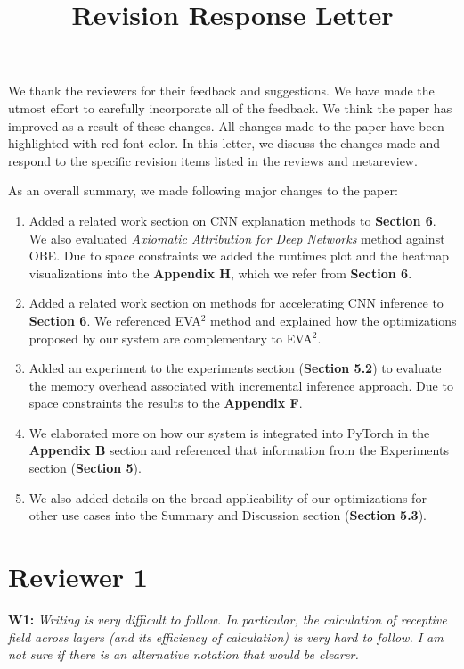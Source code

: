 \documentclass[preprint]{vldb}
\title{Revision Response Letter}
\author{}
\begin{document}
\maketitle

We thank the reviewers for their feedback and suggestions.
We have made the utmost effort to carefully incorporate all of the feedback. 
We think the paper has improved as a result of these changes.
All changes made to the paper have been highlighted with red font color.
In this letter, we discuss the changes made and respond to the specific revision items listed in the reviews and metareview.

As an overall summary, we made following major changes to the paper:
\begin{enumerate}
	\item Added a related work section on CNN explanation methods to \textbf{Section 6}.
	We also evaluated \textit{Axiomatic Attribution for Deep Networks} method against OBE.
	Due to space constraints we added the runtimes plot and the heatmap visualizations into the \textbf{Appendix H}, which we refer from \textbf{Section 6}.
	\item Added a related work section on methods for accelerating CNN inference to \textbf{Section 6}.
	We referenced EVA$^2$ method and explained how the optimizations proposed by our system are complementary to EVA$^2$.
	\item Added an experiment to the experiments section (\textbf{Section 5.2}) to evaluate the memory overhead associated with incremental inference approach. Due to space constraints the results to the \textbf{Appendix F}.
	\item We elaborated more on how our system is integrated into PyTorch in the \textbf{Appendix B} section and referenced that information from the Experiments section (\textbf{Section 5}).
	\item We also added details on the broad applicability of our optimizations for other use cases into the Summary and Discussion section (\textbf{Section 5.3}).
\end{enumerate}

\section{Reviewer 1}

\vspace{2mm}
\noindent \textbf{W1:} \textit{Writing is very difficult to follow. In particular, the calculation of receptive field across layers (and its efficiency of calculation) is very hard to follow. I am not sure if there is an alternative notation that would be clearer.}
\end{document}
